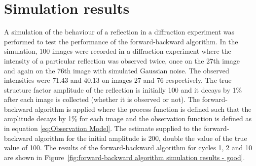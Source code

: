 \section{Simulation results}
\label{sec:Simulation Results}
A simulation of the behaviour of a reflection in a diffraction experiment was performed to test the performance of the forward-backward algorithm.
In the simulation, 100 images were recorded in a diffraction experiment where the intensity of a particular reflection was observed twice, once on the 27th image and again on the 76th image with simulated Gaussian noise.
The observed intensities were 71.43 and 40.13 on images 27 and 76 respectively.
The true structure factor amplitude of the reflection is initially 100 and it decays by 1\% after each image is collected (whether it is observed or not).
The forward-backward algorithm is applied where the process function is defined such that the amplitude decays by 1\% for each image and the observation function is defined as in equation \ref{eq:Observation Model}.
The estimate supplied to the forward-backward algorithm for the initial amplitude is 200, double the value of the true value of 100.
The results of the forward-backward algorithm for cycles 1, 2 and 10 are shown in Figure~\ref{fig:forward-backward algorithm simulation results - good}.
